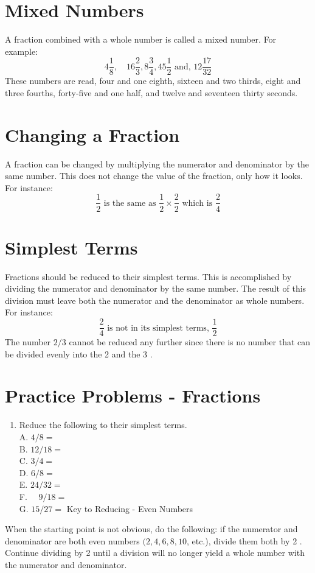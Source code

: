\documentclass[10pt]{article}
\begin{document}
\section{Mixed Numbers}
A fraction combined with a whole number is called a mixed number. For example:
$$
4 \frac{1}{8}, \quad 16 \frac{2}{3}, 8 \frac{3}{4}, 45 \frac{1}{2} \text { and, } 12 \frac{17}{32}
$$
These numbers are read, four and one eighth, sixteen and two thirds, eight and three fourths, forty-five and one half, and twelve and seventeen thirty seconds.

\section{Changing a Fraction}
A fraction can be changed by multiplying the numerator and denominator by the same number. This does not change the value of the fraction, only how it looks. For instance:
$$
\frac{1}{2} \text { is the same as } \frac{1}{2} \times \frac{2}{2} \text { which is } \frac{2}{4}
$$

\section{Simplest Terms}
Fractions should be reduced to their simplest terms. This is accomplished by dividing the numerator and denominator by the same number. The result of this division must leave both the numerator and the denominator as whole numbers. For instance:
$$
\frac{2}{4} \text { is not in its simplest terms, } \frac{1}{2}
$$
The number $2 / 3$ cannot be reduced any further since there is no number that can be divided evenly into the 2 and the 3 .

\section{Practice Problems - Fractions}
\begin{enumerate}
  \item Reduce the following to their simplest terms.\\
A. $4 / 8=$\\
B. $12 / 18=$\\
C. $3 / 4=$\\
D. $6 / 8=$\\
E. $24 / 32=$\\
F. $\quad 9 / 18=$\\
G. $15 / 27=$ Key to Reducing - Even Numbers
\end{enumerate}
When the starting point is not obvious, do the following: if the numerator and denominator are both even numbers $(2,4,6,8,10$, etc.), divide them both by 2 . Continue dividing by 2 until a division will no longer yield a whole number with the numerator and denominator.
\end{document}
